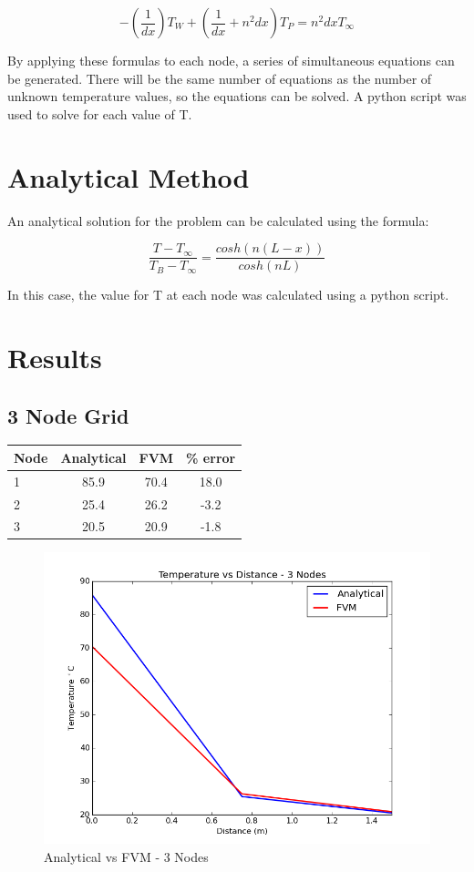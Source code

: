 \documentclass[review]{elsarticle}
\begin{document}
\[ - \left(\frac{1}{dx}\right)T_W + \left(\frac{1}{dx} + n^{2}dx\right)T_P  = n^2dxT_{\infty} \]



By applying these formulas to each node, a series of simultaneous equations can be generated. There will be the same number of equations as the number of unknown temperature values, so the equations can be solved.
A python script was used to solve for each value of T.

\section{Analytical Method}

An analytical solution for the problem can be calculated using the formula:

\[\frac{T- T_{\infty}}{T_{B} - T_{\infty}} = \frac{cosh(n(L-x))}{cosh(nL)} \]

In this case, the value for T at each node was calculated using a python script.


\section{Results}

\subsection{3 Node Grid}

\begin{center}
  \begin{tabular}{| l | c | c | c |}
    \hline
    Node & Analytical & FVM & \% error \\ \hline
    1 & 85.9 & 70.4 & 18.0 \\
    2 & 25.4 & 26.2 & -3.2 \\
    3 & 20.5 & 20.9 & -1.8 \\
    \hline
  \end{tabular}
\end{center}

\begin{figure}[H]
    \includegraphics[width=\textwidth]{img/3_nodes_avsf.png}
    \caption{Analytical vs FVM - 3 Nodes}
    \label{3nodes}
\end{figure}
\end{document}
